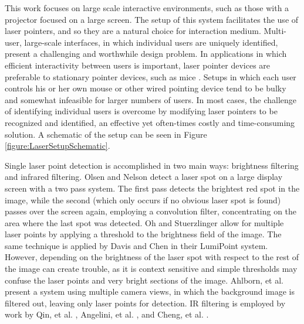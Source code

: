 This work focuses on large scale interactive environments, such as those with a projector focused on a large screen. The setup of this system facilitates the use of laser pointers, and so they are a natural choice for interaction medium. 
% 
Multi-user, large-scale interfaces, in which individual users are uniquely identified, present a challenging and worthwhile design problem. In applications in which efficient interactivity between users is important, laser pointer devices are preferable to stationary pointer devices, such as mice \cite{Pavlovych:2008:ESC:1462027.1462035}. Setups in which each user controls his or her own mouse or other wired pointing device tend to be bulky and somewhat infeasible for larger numbers of users. In most cases, the challenge of identifying individual users is overcome by modifying laser pointers to be recognized and identified, an effective yet often-times costly and time-consuming solution. A schematic of the setup can be seen in Figure \ref{figure:LaserSetupSchematic}.



Single laser point detection is accomplished in two main ways:
brightness filtering and infrared filtering. Olsen and Nelson \cite{olsen2001} detect a
laser spot on a large display screen with a two pass
system. The first pass detects the brightest red spot
in the image, while the second (which only occurs if no obvious laser
spot is found) passes over the screen again, employing a convolution
filter, concentrating on the area where the last spot was detected. Oh
and Stuerzlinger \cite{Oh02laserpointers} allow for multiple laser points by applying a
threshold to the brightness field of the
image. The same technique is applied by Davis
and Chen \cite{Davis00lumipoint:multi-user} in their LumiPoint
system. However, depending on the
brightness of the laser spot with respect to the rest of the image can
create trouble, as it is context sensitive and simple thresholds may
confuse the laser points and very bright sections of the
image. Ahlborn, et al. \cite{Ahlborn:2005:PSL:1101616.1101637} present
a system using multiple camera views, in which the background image is
filtered out, leaving only laser points for detection. IR filtering is
employed by work by Qin, et al. \cite{Qin:2010:SLP:1842993.1843022},
Angelini, et al. \cite{angelini:multi-user}, and Cheng, et
al. \cite{Cheng:2003:DIL:857080.857088}.


